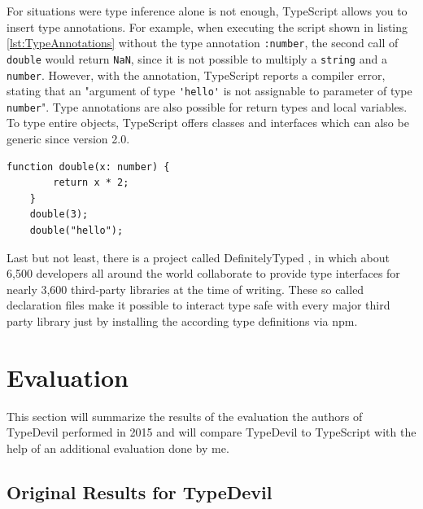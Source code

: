 \documentclass[runningheads,a4paper]{llncs}
\begin{document}
For situations were type inference alone is not enough, TypeScript allows you to insert type annotations.
For example, when executing the script shown in listing \ref{lst:TypeAnnotations} without the type annotation \lstinline[columns=fixed]{:number}, the second call of \lstinline[columns=fixed]{double} would return \lstinline[columns=fixed]{NaN}, since it is not possible to multiply a \lstinline[columns=fixed]{string} and a \lstinline[columns=fixed]{number}.
However, with the annotation, TypeScript reports a compiler error, stating that an "argument of type \lstinline[columns=fixed]{'hello'} is not assignable to parameter of type \lstinline[columns=fixed]{number}".
Type annotations are also possible for return types and local variables.
To type entire objects, TypeScript offers classes and interfaces which can also be generic since version 2.0.

\medskip\medskip
\lstset{language=javascript}
\begin{minipage}{\linewidth}
\begin{lstlisting}[frame=single, caption=Type Annotations, label={lst:TypeAnnotations}]
    function double(x: number) {
        return x * 2;
    }
    double(3);
    double("hello");
\end{lstlisting}
\end{minipage}

Last but not least, there is a project called DefinitelyTyped \cite{DefinitelyTyped}, in which about 6,500 developers all around the world collaborate to provide type interfaces for nearly 3,600 third-party libraries at the time of writing.
These so called declaration files make it possible to interact type safe with every major third party library just by installing the according type definitions via npm.

\section{Evaluation}

This section will summarize the results of the evaluation the authors of TypeDevil performed in 2015 and will compare TypeDevil to TypeScript with the help of an additional evaluation done by me.

\subsection{Original Results for TypeDevil}
\end{document}
